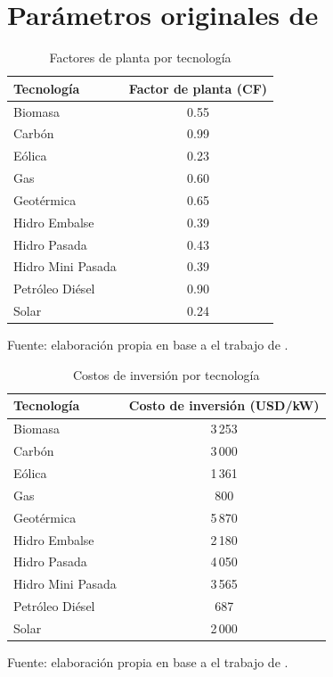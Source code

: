 \section{Parámetros originales de \protect{}}
\begin{table}[H]
\centering
\caption{Factores de planta por tecnología}
\label{tab:factor_planta}
\renewcommand{\arraystretch}{1.2}
\setlength{\tabcolsep}{14pt}
\begin{tabular}{l c}
\toprule
\textbf{Tecnología} & \textbf{Factor de planta (CF)} \\
\midrule
Biomasa           & 0.55 \\
Carbón            & 0.99 \\
Eólica            & 0.23 \\
Gas               & 0.60 \\
Geotérmica        & 0.65 \\
Hidro Embalse     & 0.39 \\
Hidro Pasada      & 0.43 \\
Hidro Mini Pasada & 0.39 \\
Petróleo Diésel   & 0.90 \\
Solar             & 0.24 \\
\bottomrule
\end{tabular}

\vspace{0.1cm}
\footnotesize{Fuente: elaboración propia en base a el trabajo de .}
\end{table}
\begin{table}[H]
\centering
\caption{Costos de inversión por tecnología}
\label{tab:inv_cost}
\renewcommand{\arraystretch}{1.2}
\setlength{\tabcolsep}{14pt}
\begin{tabular}{l c}
\toprule
\textbf{Tecnología} & \textbf{Costo de inversión (USD/kW)} \\
\midrule
Biomasa            & 3\,253 \\
Carbón             & 3\,000 \\
Eólica             & 1\,361 \\
Gas                & 800 \\
Geotérmica         & 5\,870 \\
Hidro Embalse      & 2\,180 \\
Hidro Pasada       & 4\,050 \\
Hidro Mini Pasada  & 3\,565 \\
Petróleo Diésel    & 687 \\
Solar              & 2\,000 \\
\bottomrule
\end{tabular}

\vspace{0.1cm}
\footnotesize{Fuente: elaboración propia en base a el trabajo de .}
\end{table}

